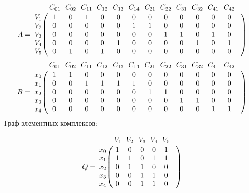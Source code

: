 \documentclass{article}
\begin{document}
\begin{figure}[h]
\end{figure}
$$
 A =
\bordermatrix{ & C_{01} \!&\! C_{02} \!&\! C_{11} \!&\! C_{12} \!&\! C_{13} \!&\! C_{14} \!&\! C_{21} \!&\! C_{22} \!&\! C_{31} \!&\! C_{32} \!&\! C_{41} \!&\! C_{42} \!&\! \cr 
V_{1} \!&\! 1 \!&\! 0 \!&\! 1 \!&\! 0 \!&\! 0 \!&\! 0 \!&\! 0 \!&\! 0 \!&\! 0 \!&\! 0 \!&\! 0 \!&\! 0 \!&\! \cr
V_{2} \!&\! 0 \!&\! 0 \!&\! 0 \!&\! 0 \!&\! 0 \!&\! 1 \!&\! 1 \!&\! 0 \!&\! 0 \!&\! 0 \!&\! 0 \!&\! 0 \!&\! \cr
V_{3} \!&\! 0 \!&\! 0 \!&\! 0 \!&\! 0 \!&\! 0 \!&\! 0 \!&\! 0 \!&\! 1 \!&\! 1 \!&\! 0 \!&\! 1 \!&\! 0 \!&\! \cr
V_{4} \!&\! 0 \!&\! 0 \!&\! 0 \!&\! 0 \!&\! 1 \!&\! 0 \!&\! 0 \!&\! 0 \!&\! 0 \!&\! 1 \!&\! 0 \!&\! 1 \!&\! \cr
V_{5} \!&\! 0 \!&\! 1 \!&\! 0 \!&\! 1 \!&\! 0 \!&\! 0 \!&\! 0 \!&\! 0 \!&\! 0 \!&\! 0 \!&\! 0 \!&\! 0 \!&\! \cr
}$$
$$
B =
\bordermatrix{ & C_{01} \!&\! C_{02} \!&\! C_{11} \!&\! C_{12} \!&\! C_{13} \!&\! C_{14} \!&\! C_{21} \!&\! C_{22} \!&\! C_{31} \!&\! C_{32} \!&\! C_{41} \!&\! C_{42} \!&\! \cr 
x_{0} \!&\! 1 \!&\! 1 \!&\! 0 \!&\! 0 \!&\! 0 \!&\! 0 \!&\! 0 \!&\! 0 \!&\! 0 \!&\! 0 \!&\! 0 \!&\! 0 \!&\! \cr
x_{1} \!&\! 0 \!&\! 0 \!&\! 1 \!&\! 1 \!&\! 1 \!&\! 1 \!&\! 0 \!&\! 0 \!&\! 0 \!&\! 0 \!&\! 0 \!&\! 0 \!&\! \cr
x_{2} \!&\! 0 \!&\! 0 \!&\! 0 \!&\! 0 \!&\! 0 \!&\! 0 \!&\! 1 \!&\! 1 \!&\! 0 \!&\! 0 \!&\! 0 \!&\! 0 \!&\! \cr
x_{3} \!&\! 0 \!&\! 0 \!&\! 0 \!&\! 0 \!&\! 0 \!&\! 0 \!&\! 0 \!&\! 0 \!&\! 1 \!&\! 1 \!&\! 0 \!&\! 0 \!&\! \cr
x_{4} \!&\! 0 \!&\! 0 \!&\! 0 \!&\! 0 \!&\! 0 \!&\! 0 \!&\! 0 \!&\! 0 \!&\! 0 \!&\! 0 \!&\! 1 \!&\! 1 \!&\! \cr
}$$
Граф элементных комплексов:
\begin{figure}[h]
\end{figure}
$$
Q =
\bordermatrix{ & V_{1} \!&\! V_{2} \!&\! V_{3} \!&\! V_{4} \!&\! V_{5} \!&\! \cr 
x_{0} \!&\! 1 \!&\! 0 \!&\! 0 \!&\! 0 \!&\! 1 \!&\! \cr
x_{1} \!&\! 1 \!&\! 1 \!&\! 0 \!&\! 1 \!&\! 1 \!&\! \cr
x_{2} \!&\! 0 \!&\! 1 \!&\! 1 \!&\! 0 \!&\! 0 \!&\! \cr
x_{3} \!&\! 0 \!&\! 0 \!&\! 1 \!&\! 1 \!&\! 0 \!&\! \cr
x_{4} \!&\! 0 \!&\! 0 \!&\! 1 \!&\! 1 \!&\! 0 \!&\! \cr
}$$
\end{document}
